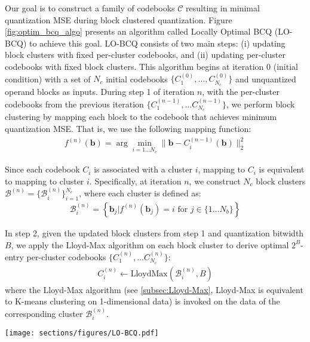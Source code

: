 Our goal is to construct a family of codebooks $\mathcal{C}$ resulting in minimal quantization MSE during block clustered quantization. Figure \ref{fig:optim_bcq_algo} presents an algorithm called Locally Optimal BCQ (LO-BCQ) to achieve this goal. LO-BCQ consists of two main steps: (i) updating block clusters with fixed per-cluster codebooks, and (ii) updating per-cluster codebooks with fixed block clusters. This algorithm begins at iteration $0$ (initial condition) with a set of $N_c$ initial codebooks $\{C_1^{(0)}, \ldots, C_{N_c}^{(0)}\}$ and unquantized operand blocks as inputs. During step 1 of iteration $n$, with the per-cluster codebooks from the previous iteration $\{C_1^{(n-1)}, \ldots C_{N_c}^{(n-1)}\}$, we perform block clustering by mapping each block to the codebook that achieves minimum quantization MSE. That is, we use the following mapping function: 
\begin{align}
    \label{eq:mapping_at_iter_n}
    f^{(n)}({\bm{b}}) = \arg \min_{i=1\ldots N_c} \lVert{\bm{b}} - C_i^{(n-1)}({\bm{b}})\rVert^2_2
\end{align}

Since each codebook $C_i$ is associated with a cluster $i$,  mapping to $C_i$ is equivalent to mapping to cluster $i$. Specifically, at iteration $n$, we construct $N_c$ block clusters $\bm{\mathcal{B}}^{(n)}=\{\mathcal{B}_i^{(n)}\}_{i=1}^{N_c}$, where each cluster is defined as:
\begin{align}
    \label{eq:clustering_step}
    \mathcal{B}_i^{(n)} = \left\{ {\bm{b}_j} \big | f^{(n)}({\bm{b}}_j) = i \text{ for } j \in \{1\ldots N_b\}\right\}
\end{align}

In step 2, given the updated block clusters from step 1 and quantization bitwidth $B$, we apply the Lloyd-Max algorithm on each block cluster to derive optimal $2^B$-entry per-cluster codebooks $\{C_1^{(n)}, \ldots C_{N_c}^{(n)}\}$:
\begin{align}
    \label{eq:quantizers_update}
    C_i^{(n)} \leftarrow \text{LloydMax}(\mathcal{B}_i^{(n)},B) 
\end{align}
where the Lloyd-Max algorithm (see \ref{subsec:Lloyd-Max}, Lloyd-Max is equivalent to K-means clustering on 1-dimensional data) is invoked on the data of the corresponding cluster $\mathcal{B}_i^{(n)}$.
\begin{figure*}[t]
  \centering
  \texttt{[image: sections/figures/LO-BCQ.pdf]}
  \caption{\small Overview of LO-BCQ algorithm: The algorithm starts with a set of initial per-cluster codebooks, and then iteratively performs two steps (i) fix per-cluster codebooks and update block clusters and (ii) fix block clusters and update per-cluster codebooks.}
  \label{fig:optim_bcq_algo}
\end{figure*} 

